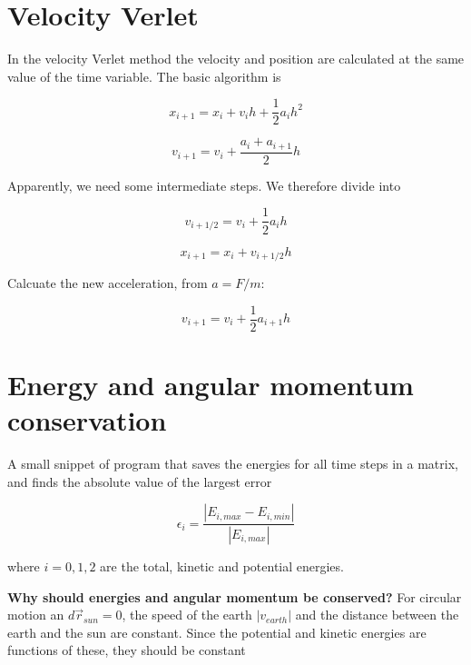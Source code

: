 \documentclass[11pt]{article}
\begin{document}
\section{Velocity Verlet}

\begin{flushleft}
In the velocity Verlet method the velocity and position are calculated at the same value of the time variable. The basic algorithm is

\begin{equation}
x_{i+1} = x_i + v_i h + \frac{1}{2} a_i h^2
\end{equation}

\begin{equation}
v_{i+1} = v_i + \frac{a_i + a_{i+1}}{2}h
\end{equation}

Apparently, we need some intermediate steps. We therefore divide into 

\begin{equation}
v_{i+1/2} = v_i + \frac{1}{2} a_i h
\end{equation}

\begin{equation}
x_{i+1} = x_i + v_{i+1/2} h
\end{equation}

Calcuate the new acceleration, from $a = F/m$:

\begin{equation}
v_{i+1} = v_i + \frac{1}{2} a_{i+1} h
\end{equation}

\section{Energy and angular momentum conservation}

\begin{flushleft}
A small snippet of program that saves the energies for all time steps in a matrix, and finds the absolute value of the largest error

\begin{equation}
\epsilon_i = \frac{|E_{i, max} - E_{i, min}|}{|E_{i, max}|}
\end{equation}

where $i=0,1,2$ are the total, kinetic and potential energies.
\end{flushleft}

\begin{flushleft}
\textbf{Why should energies and angular momentum be conserved?} For circular motion an $d\vec{r}_{sun}=0$, the speed of the earth $|v_{earth}|$ and the distance between the earth and the sun are constant. Since the potential and kinetic energies are functions of these, they should be constant


\end{flushleft}
\end{flushleft}
\end{document}
